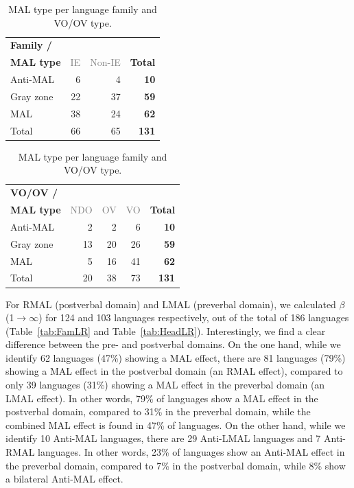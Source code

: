 \begin{table}[!ht]
\begin{center}
\begin{tabular}{l r r r}
\toprule
\textbf{Family /} & & & \\
\textbf{MAL type} & \textcolor{gray}{IE} & \textcolor{gray}{Non-IE} & \textcolor{totalgreen}{\textbf{Total}} \\
\midrule
\rowcolor{rowred} Anti-MAL & 6 & 4 & \textcolor{totalgreen}{\textbf{10}} \\
\rowcolor{rowyellow} Gray zone & 22 & 37 & \textcolor{totalgreen}{\textbf{59}} \\
\rowcolor{rowgreen} MAL & 38 & 24 & \textcolor{totalgreen}{\textbf{62}} \\
\rowcolor{rowgray} Total & 66 & 65 & \textcolor{totalgreen}{\textbf{131}} \\
\bottomrule
\end{tabular}

\vspace{6pt}

\begin{tabular}{l r r r r}
\toprule
\textbf{VO/OV /} & & & & \\
\textbf{MAL type} & \textcolor{gray}{NDO} & \textcolor{gray}{OV} & \textcolor{gray}{VO} & \textcolor{totalgreen}{\textbf{Total}} \\
\midrule
\rowcolor{rowred} Anti-MAL & 2 & 2 & 6 & \textcolor{totalgreen}{\textbf{10}} \\
\rowcolor{rowyellow} Gray zone & 13 & 20 & 26 & \textcolor{totalgreen}{\textbf{59}} \\
\rowcolor{rowgreen} MAL & 5 & 16 & 41 & \textcolor{totalgreen}{\textbf{62}} \\
\rowcolor{rowgray} Total & 20 & 38 & 73 & \textcolor{totalgreen}{\textbf{131}} \\
\bottomrule
\end{tabular}
\caption{MAL type per language family and VO/OV type.}
\label{tab:MAL}
\end{center}
\end{table}

For RMAL (postverbal domain) and LMAL (preverbal domain), we calculated $\beta$(1$\rightarrow\infty$) for 124 and 103 languages respectively, out of the total of 186 languages (Table~\ref{tab:FamLR} and Table~\ref{tab:HeadLR}). Interestingly, we find a clear difference between the pre- and postverbal domains. On the one hand, while we identify 62 languages (47\%) showing a MAL effect, there are 81 languages (79\%) showing a MAL effect in the postverbal domain (an RMAL effect), compared to only 39 languages (31\%) showing a MAL effect in the preverbal domain (an LMAL effect). In other words, 79\% of languages show a MAL effect in the postverbal domain, compared to 31\% in the preverbal domain, while the combined MAL effect is found in 47\% of languages. On the other hand, while we identify 10 Anti-MAL languages, there are 29 Anti-LMAL languages and 7 Anti-RMAL languages. In other words, 23\% of languages show an Anti-MAL effect in the preverbal domain, compared to 7\% in the postverbal domain, while 8\% show a bilateral Anti-MAL effect. 

